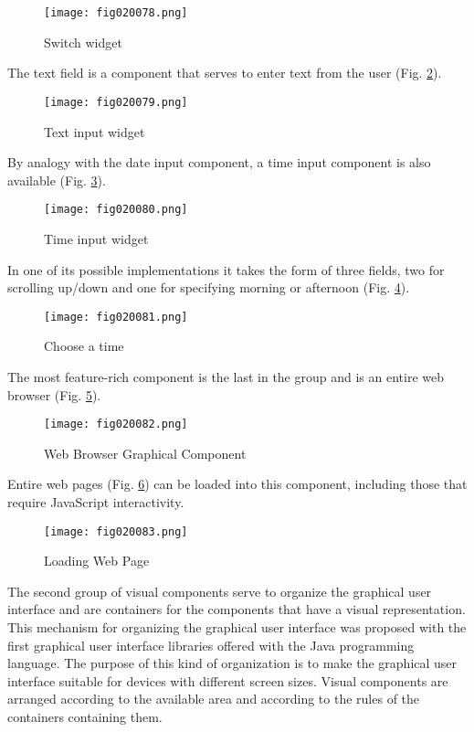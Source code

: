 \begin{figure}[H]
   \centering
   \texttt{[image: fig020078.png]}
   \caption{Switch widget}
\label{fig020078}
\end{figure}

The text field is a component that serves to enter text from the user (Fig. \ref{fig020079}).

\begin{figure}[H]
   \centering
   \texttt{[image: fig020079.png]}
   \caption{Text input widget}
\label{fig020079}
\end{figure}

By analogy with the date input component, a time input component is also available (Fig. \ref{fig020080}).

\begin{figure}[H]
   \centering
   \texttt{[image: fig020080.png]}
   \caption{Time input widget}
\label{fig020080}
\end{figure}

In one of its possible implementations it takes the form of three fields, two for scrolling up/down and one for specifying morning or afternoon (Fig. \ref{fig020081}).

\begin{figure}[H]
   \centering
   \texttt{[image: fig020081.png]}
   \caption{Choose a time}
\label{fig020081}
\end{figure}

The most feature-rich component is the last in the group and is an entire web browser (Fig. \ref{fig020082}).

\begin{figure}[H]
   \centering
   \texttt{[image: fig020082.png]}
   \caption{Web Browser Graphical Component}
\label{fig020082}
\end{figure}

Entire web pages (Fig. \ref{fig020083}) can be loaded into this component, including those that require JavaScript interactivity.

\begin{figure}[H]
   \centering
   \texttt{[image: fig020083.png]}
   \caption{Loading Web Page}
\label{fig020083}
\end{figure}

The second group of visual components serve to organize the graphical user interface and are containers for the components that have a visual representation. This mechanism for organizing the graphical user interface was proposed with the first graphical user interface libraries offered with the Java programming language. The purpose of this kind of organization is to make the graphical user interface suitable for devices with different screen sizes. Visual components are arranged according to the available area and according to the rules of the containers containing them.

